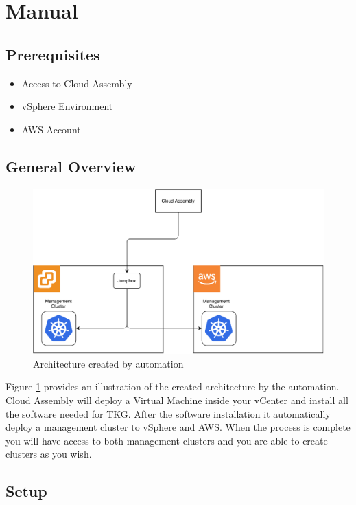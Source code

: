 \documentclass{article}
\begin{document}
\newpage

\section{Manual}
\subsection{Prerequisites}
\begin{itemize}
  \item Access to Cloud Assembly
  \item vSphere Environment 
  \item AWS Account
\end{itemize}

\subsection{General Overview}

\begin{figure}[h!]
\centering
\includegraphics[scale=0.7]{figures/overview-mc.pdf}
\caption{Architecture created by automation}
\label{fig:arch}
\end{figure}

Figure \ref{fig:arch} provides an illustration of the created architecture by the automation. Cloud Assembly will deploy a Virtual Machine inside your vCenter and install all the software needed for TKG. After the software installation it automatically deploy a management cluster to vSphere and AWS. When the process is complete you will have access to both management clusters and you are able to create clusters as you wish. 


\subsection{Setup}
\end{document}
